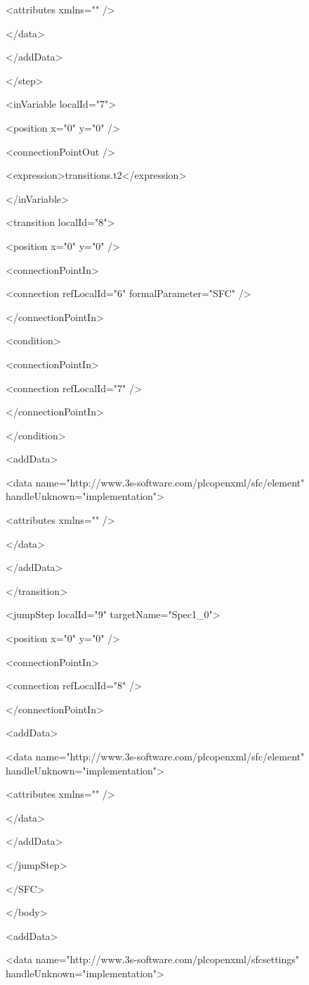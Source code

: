     <attributes xmlns="" />

   </data>

  </addData>

 </step>

 <inVariable localId="7">

  <position x="0" y="0" />

  <connectionPointOut />

  <expression>transitions.t2</expression>

 </inVariable>

 <transition localId="8">

  <position x="0" y="0" />

  <connectionPointIn>

   <connection refLocalId="6" formalParameter="SFC" />

  </connectionPointIn>

  <condition>

   <connectionPointIn>

    <connection refLocalId="7" />

   </connectionPointIn>

  </condition>

  <addData>

   <data name="http://www.3s-software.com/plcopenxml/sfc/element" handleUnknown="implementation">

    <attributes xmlns="" />

   </data>

  </addData>

 </transition>

 <jumpStep localId="9" targetName="Spec1\_0">

  <position x="0" y="0" />

  <connectionPointIn>

   <connection refLocalId="8" />

  </connectionPointIn>

  <addData>

   <data name="http://www.3s-software.com/plcopenxml/sfc/element" handleUnknown="implementation">

    <attributes xmlns="" />

   </data>

  </addData>

 </jumpStep>

</SFC>

</body>

<addData>

<data name="http://www.3s-software.com/plcopenxml/sfcsettings" handleUnknown="implementation">


